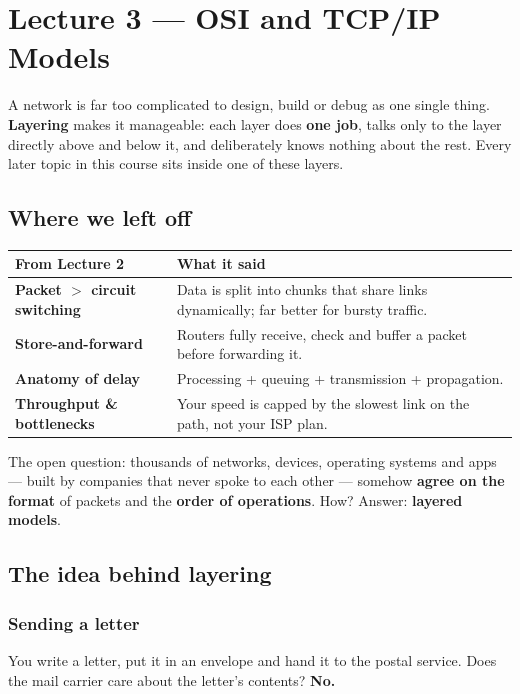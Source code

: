 \chapter{Lecture 3 --- OSI and TCP/IP Models}

\begin{keyidea}
A network is far too complicated to design, build or debug as one single thing. \textbf{Layering} makes it manageable: each layer does \textbf{one job}, talks only to the layer directly above and below it, and deliberately knows nothing about the rest. Every later topic in this course sits inside one of these layers.
\end{keyidea}

\section{Where we left off}
\begin{center}
\begin{tabularx}{\textwidth}{>{\bfseries}l X}
\toprule
From Lecture 2 & What it said \\
\midrule
Packet $>$ circuit switching & Data is split into chunks that share links dynamically; far better for bursty traffic. \\
Store-and-forward & Routers fully receive, check and buffer a packet before forwarding it. \\
Anatomy of delay & Processing + queuing + transmission + propagation. \\
Throughput \& bottlenecks & Your speed is capped by the slowest link on the path, not your ISP plan. \\
\bottomrule
\end{tabularx}
\end{center}
The open question: thousands of networks, devices, operating systems and apps --- built by companies that never spoke to each other --- somehow \textbf{agree on the format} of packets and the \textbf{order of operations}. How? Answer: \textbf{layered models}.

\section{The idea behind layering}

\subsection{Sending a letter}
You write a letter, put it in an envelope and hand it to the postal service. Does the mail carrier care about the letter's contents? \textbf{No.}

